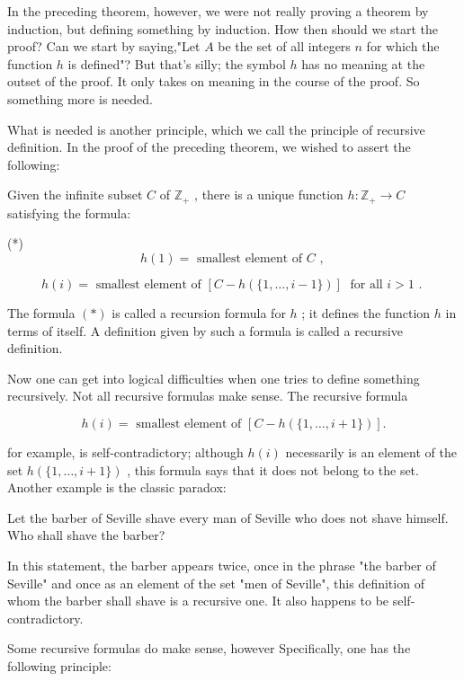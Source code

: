 In the preceding theorem, however, we were not really proving a theorem by induction, but defining something by induction. How then should we start the proof? Can we start by saying,"Let \(A\) be the set of all integers \(n\) for which the function \(h\) is defined"? But that’s silly; the symbol \(h\) has no meaning at the outset of the proof. It only takes on meaning in the course of the proof. So something more is needed.

What is needed is another principle, which we call the principle of recursive definition. In the proof of the preceding theorem, we wished to assert the following:

Given the infinite subset \(C\) of \({\mathbb{Z}}_{ + }\) , there is a unique function \(h : {\mathbb{Z}}_{ + } \rightarrow  C\) satisfying the formula:

(*)
\[
h\left( 1\right)  = \text{ smallest element of }C\text{ , }
\]

\[
h\left( i\right)  = \text{ smallest element of }\left\lbrack  {C - h\left( {\{ 1,\ldots ,i - 1\} }\right) }\right\rbrack  \;\text{ for all }i > 1\text{ . }
\]

The formula \(\left( *\right)\) is called a recursion formula for \(h\) ; it defines the function \(h\) in terms of itself. A definition given by such a formula is called a recursive definition.

Now one can get into logical difficulties when one tries to define something recursively. Not all recursive formulas make sense. The recursive formula

\[
h\left( i\right)  = \text{ smallest element of }\left\lbrack  {C - h\left( {\{ 1,\ldots ,i + 1\} }\right) }\right\rbrack  .
\]

for example, is self-contradictory; although \(h\left( i\right)\) necessarily is an element of the set \(h\left( {\{ 1,\ldots ,i + 1\} }\right)\) , this formula says that it does not belong to the set. Another example is the classic paradox:

Let the barber of Seville shave every man of Seville who does not shave himself. Who shall shave the barber?

In this statement, the barber appears twice, once in the phrase "the barber of Seville" and once as an element of the set "men of Seville", this definition of whom the barber shall shave is a recursive one. It also happens to be self-contradictory.

Some recursive formulas do make sense, however Specifically, one has the following principle:

